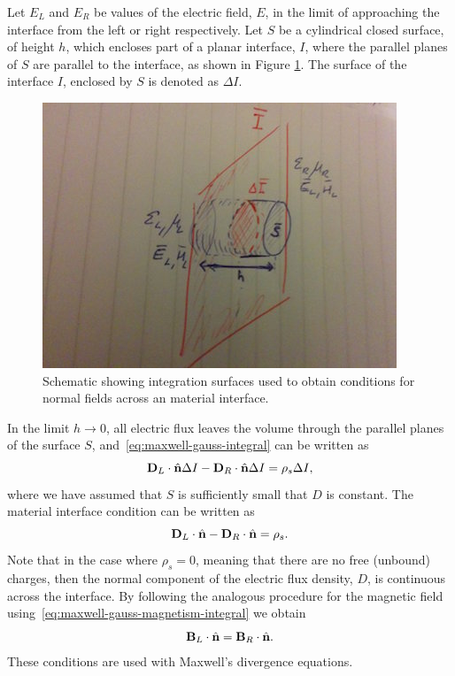 Let $E_L$ and $E_R$ be values of the electric field, $E$, in the limit of
approaching the interface from the left or right respectively. Let $S$ be a
cylindrical closed surface, of height $h$, which encloses part of a planar
interface, $I$, where the parallel planes of $S$ are parallel to the interface,
as shown in Figure \ref{fig:material-interface-derivation:E-pillbox}. The
surface of the interface $I$, enclosed by $S$ is denoted as $\Delta I$.
\begin{figure}[htbp!]
  \begin{center}
    \includegraphics[height=0.3\textheight]{Figures/Chapters/PhysicalProblem/interfaceEPillBox}
  \end{center}
  \caption{Schematic showing integration surfaces used to obtain conditions for
    normal fields across an material interface.}
  \label{fig:material-interface-derivation:E-pillbox}
\end{figure}
In the limit $h \to 0$, all electric flux leaves the volume through the parallel
planes of the surface $S$, and~\eqref{eq:maxwell-gauss-integral} can be written
as
$$
\mathbf{D}_L \cdot \hat{\mathbf{n}} \Delta I - \mathbf{D}_R \cdot \hat{\mathbf{n}}
\Delta I = \rho_s \Delta I,
$$
where we have assumed that $S$ is sufficiently small that $D$ is constant. The
material interface condition can be written as
$$
\mathbf{D}_L \cdot \hat{\mathbf{n}} - \mathbf{D}_R \cdot \hat{\mathbf{n}} = \rho_s .
$$
Note that in the case where $\rho_s = 0$, meaning that there are no free
(unbound) charges, then the normal component of the electric flux density, $D$,
is continuous across the interface. By following the analogous procedure for the
magnetic field using~\eqref{eq:maxwell-gauss-magnetism-integral} we obtain
$$
\mathbf{B}_L \cdot \hat{\mathbf{n}} = \mathbf{B}_R \cdot \hat{\mathbf{n}} .
$$
These conditions are used with Maxwell's divergence equations.

